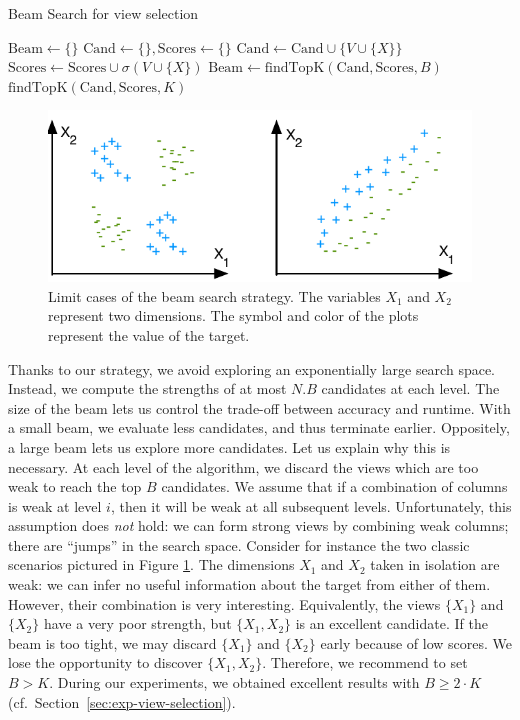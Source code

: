 \begin{algorithm}[t]
\caption{Beam Search for view selection}
\label{algo:beam_search}
\begin{algorithmic}
    \State $\text{Beam} \gets \{\}$
        \State $\text{Cand} \gets \{\}, \text{Scores} \gets \{\}$
            \State $\text{Cand} \gets \text{Cand} \cup \{V \cup \{X\} \}$
            \State $\text{Scores} \gets \text{Scores} \cup \sigma(V \cup \{X\}) $
            \EndFor
        \EndFor
        \State $\text{Beam} \gets \text{findTopK}(\text{Cand}, \text{Scores}, B)$
    \EndFor
    \State \Return $\text{findTopK}(\text{Cand}, \text{Scores}, K)$
    \EndFunction
\end{algorithmic}
\end{algorithm}
\begin{figure}[t!]
\centering
\includegraphics[width=0.7\columnwidth]{images/strength-jump}
\caption{Limit cases of the beam search strategy. The variables $X_1$ and
$X_2$ represent two dimensions. The symbol and color of the plots represent
the value of the target. }
\label{pic:strength-jump}
\end{figure}
Thanks to our strategy, we avoid exploring an exponentially large search
space. Instead, we compute the strengths of at most $N.B$ candidates at each
level. The size of the beam lets us control the trade-off between accuracy and
runtime. With a small beam, we evaluate less candidates, and thus terminate
earlier. Oppositely, a large beam lets us explore more candidates.  Let us
explain why this is necessary. At each level of the algorithm, we discard the
views which are too weak to reach the top $B$ candidates. We assume that if a
combination of columns is weak at level $i$, then it will be weak at all
subsequent levels.  Unfortunately, this assumption does \emph{not} hold: we can
form strong views by combining weak columns; there are ``jumps'' in the search
space.  Consider for instance the two classic scenarios pictured in Figure
\ref{pic:strength-jump}.  The dimensions $X_1$ and $X_2$ taken in isolation are
weak: we can infer no useful information about the target from either of them.
However, their combination is very interesting. Equivalently, the views
$\{X_1\}$ and $\{X_2\}$ have a very poor strength, but $\{X_1, X_2\}$ is an
excellent candidate. If the beam is too tight, we may discard $\{X_1\}$ and
$\{X_2\}$ early because of low scores.  We lose the opportunity to discover $\{X_1, X_2\}$. Therefore, we
recommend to set $B > K$. During our experiments, we obtained excellent results
with $B \geq 2 \cdot K$ (cf.\ Section~\ref{sec:exp-view-selection}).

